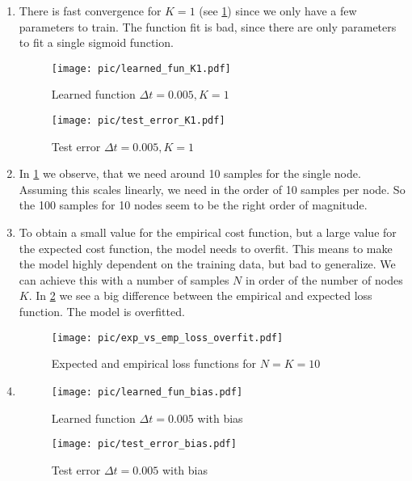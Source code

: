 \documentclass[a4paper,11pt]{scrartcl}
\newcommand*{\Dt}{\Delta{}t}
\begin{document}
\begin{enumerate}
\begin{enumerate}[leftmargin=1em]
  \item
    There is fast convergence for $K=1$ (see \cref{fig:test_error_K1}) since we
    only have a few parameters to train.
    The function fit is bad, since there are only parameters to fit a single
    sigmoid function.

    \begin{figure}[h]
        \begin{minipage}[b]{.5\linewidth}
          \centering
          \texttt{[image: pic/learned\_fun\_K1.pdf]}
          \caption{Learned function $\Dt=0.005, K=1$}
          \label{fig:learned_fun_K1}
        \end{minipage}%
        \begin{minipage}[b]{.5\linewidth}
          \centering
          \texttt{[image: pic/test\_error\_K1.pdf]}
          \caption{Test error $\Dt=0.005, K=1$}
          \label{fig:test_error_K1}
        \end{minipage}
    \end{figure}

   \item
     In \cref{fig:test_error_K1} we observe, that we need around 10 samples for
     the single node.
     Assuming this scales linearly, we need in the order of 10 samples per node.
     So the 100 samples for 10 nodes seem to be the right order of magnitude.

   \item
     To obtain a small value for the empirical cost function, but a large value
     for the expected cost function, the model needs to overfit.
     This means to make the model highly dependent on the training data, but bad
     to generalize.
     We can achieve this with a number of samples $N$ in order of the number of
     nodes $K$.
     In \cref{fig:exp_vs_emp_overfit} we see a big difference between the
     empirical and expected loss function.
     The model is overfitted.

    \begin{figure}[h]
        \centering
        \texttt{[image: pic/exp\_vs\_emp\_loss\_overfit.pdf]}
        \caption{Expected and empirical loss functions for $N=K=10$}
        \label{fig:exp_vs_emp_overfit}
    \end{figure}

   \item
    \begin{figure}[h]
        \begin{minipage}[b]{.5\linewidth}
          \centering
          \texttt{[image: pic/learned\_fun\_bias.pdf]}
          \caption{Learned function $\Dt=0.005$ with bias}
          \label{fig:learned_fun_bias}
        \end{minipage}%
        \begin{minipage}[b]{.5\linewidth}
          \centering
          \texttt{[image: pic/test\_error\_bias.pdf]}
          \caption{Test error $\Dt=0.005$ with bias}
          \label{fig:test_error_bias}
        \end{minipage}
    \end{figure}


\end{enumerate}
\end{enumerate}
\end{document}
